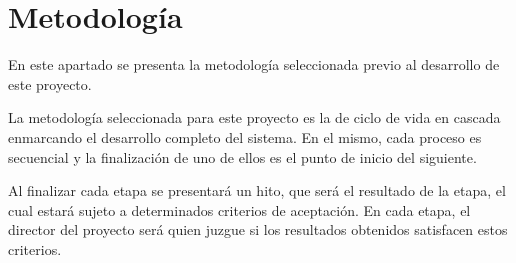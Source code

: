         
\section{Metodología}

    \par
    En este apartado se presenta la metodología seleccionada previo al desarrollo de este proyecto.
    \par La metodología seleccionada para este proyecto es la de ciclo de vida en cascada enmarcando el desarrollo completo del sistema. En el mismo, cada proceso es secuencial y la finalización de uno de ellos es el punto de inicio del siguiente.
    
    \par Al finalizar cada etapa se presentará un hito, que será el resultado de la etapa, el cual estará sujeto a determinados criterios de aceptación. En cada etapa, el director del proyecto será quien juzgue si los resultados obtenidos satisfacen estos criterios.


